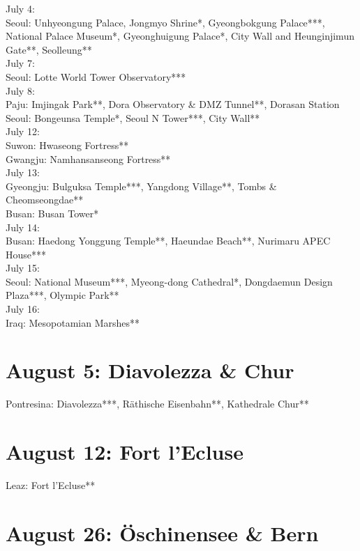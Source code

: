July 4:\\
Seoul: Unhyeongung Palace, Jongmyo Shrine*, Gyeongbokgung Palace***, National Palace Museum*, Gyeonghuigung Palace*, City Wall and Heunginjimun Gate**, Seolleung**\\

July 7:\\
Seoul: Lotte World Tower Observatory***\\

July 8:\\
Paju: Imjingak Park**, Dora Observatory \& DMZ Tunnel**, Dorasan Station\\
Seoul: Bongeunsa Temple*, Seoul N Tower***, City Wall**\\

July 12:\\
Suwon: Hwaseong Fortress**\\
Gwangju: Namhansanseong Fortress**\\

July 13:\\
Gyeongju: Bulguksa Temple***, Yangdong Village**, Tombs \& Cheomseongdae**\\
Busan: Busan Tower*\\

July 14:\\
Busan: Haedong Yonggung Temple**, Haeundae Beach**, Nurimaru APEC House***\\

July 15:\\
Seoul: National Museum***, Myeong-dong Cathedral*, Dongdaemun Design Plaza***, Olympic Park**\\

July 16:\\
Iraq: Mesopotamian Marshes**

\section{August 5: Diavolezza \& Chur}
\label{Diavolezza2018}

Pontresina: Diavolezza***, R\"athische Eisenbahn**, Kathedrale Chur**

\section{August 12: Fort l'Ecluse}
\label{FortlEcluse}

Leaz: Fort l'Ecluse**

\section{August 26: \"Oschinensee \& Bern}
\label{Oeschinen2018}

